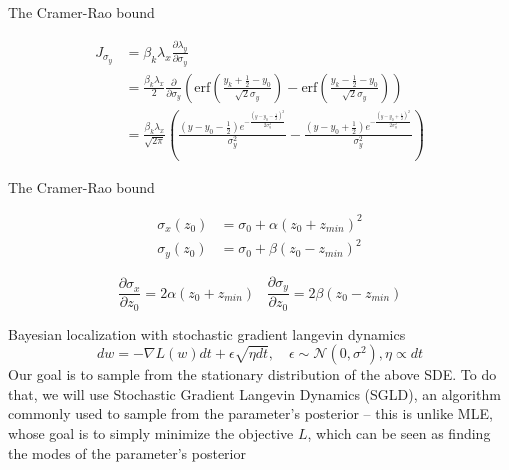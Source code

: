 \documentclass[aspectratio=169]{beamer}
\begin{document}
\begin{frame}{The Cramer-Rao bound}

\begin{align*}
J_{\sigma_{y}} &= \beta_{k}\lambda_{x}\frac{\partial \lambda_{y}}{\partial \sigma_{y}} \\
&= \frac{\beta_{k}\lambda_{x}}{2}\frac{\partial}{\partial \sigma_{y}}\left(\mathrm{erf}\left(\frac{y_{k}+\frac{1}{2}-y_{0}}{\sqrt{2}\sigma_{y}}\right) -\mathrm{erf}\left(\frac{y_{k}-\frac{1}{2}-y_{0}}{\sqrt{2}\sigma_{y}}\right)\right)\\
&= \frac{\beta_{k}\lambda_{x}}{\sqrt{2\pi}}\left(\frac{\left(y-y_{0}-\frac{1}{2}\right) e^{-\frac{\left(y-y_{0}-\frac{1}{2}\right)^2}{2 \sigma_{y} ^2}}}{\sigma_{y} ^2}-\frac{ \left(y-y_{0}+\frac{1}{2}\right) e^{-\frac{\left(y-y_{0}+\frac{1}{2}\right)^2}{2 \sigma_{y} ^2}}}{\sigma_{y} ^2}\right)
\end{align*}

\end{frame}

\begin{frame}{The Cramer-Rao bound}

\begin{align*}
\sigma_{x}(z_{0}) &= \sigma_{0} + \alpha(z_{0}+z_{min})^{2}\\
\sigma_{y}(z_{0}) &= \sigma_{0} + \beta(z_{0}-z_{min})^{2}
\end{align*}

\begin{equation*}
\frac{\partial\sigma_{x}}{\partial z_{0}} = 2\alpha(z_{0}+z_{min})\;\;\; \frac{\partial\sigma_{y}}{\partial z_{0}} = 2\beta(z_{0}-z_{min})
\end{equation*}


\end{frame}

\begin{frame}{Bayesian localization with stochastic gradient langevin dynamics}
$$dw = - \nabla L(w) dt + \epsilon \sqrt{\eta dt}, \quad \epsilon \sim \mathcal N(0, \sigma^2), \eta \propto dt$$
Our goal is to sample from the stationary distribution of the above SDE. To do that, we will use Stochastic Gradient Langevin Dynamics (SGLD), an algorithm commonly used to sample from the parameter's posterior -- this is unlike MLE, whose goal is to simply minimize the objective $L$, which can be seen as finding the modes of the parameter's posterior
\end{frame}
\end{document}
